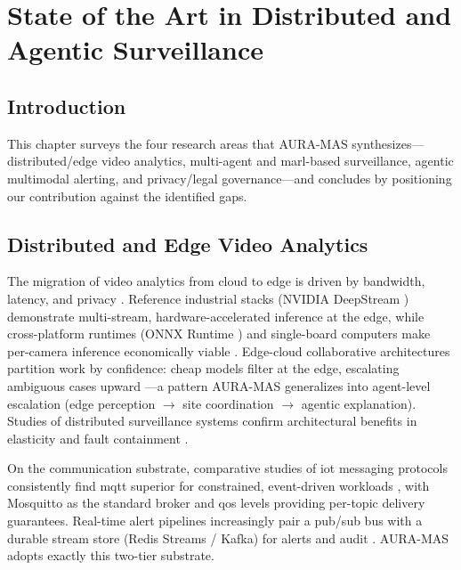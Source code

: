 \chapter{State of the Art in Distributed and Agentic Surveillance}
\label{chap:sota}

\section{Introduction}

This chapter surveys the four research areas that AURA-MAS synthesizes---distributed/edge video analytics, multi-agent and \gls{marl}-based surveillance, agentic multimodal alerting, and privacy/legal governance---and concludes by positioning our contribution against the identified gaps.

\section{Distributed and Edge Video Analytics}

The migration of video analytics from cloud to edge is driven by bandwidth, latency, and privacy \cite{do2025survey, toshpulatov2024edge}. Reference industrial stacks (NVIDIA DeepStream \cite{nvidia2024deepstream}) demonstrate multi-stream, hardware-accelerated inference at the edge, while cross-platform runtimes (ONNX Runtime \cite{kacar2024onnx}) and single-board computers make per-camera inference economically viable \cite{sbc2024review}. Edge-cloud collaborative architectures partition work by confidence: cheap models filter at the edge, escalating ambiguous cases upward \cite{ghasemi2024edgecloudai}---a pattern AURA-MAS generalizes into agent-level escalation (edge perception $\rightarrow$ site coordination $\rightarrow$ agentic explanation). Studies of distributed surveillance systems confirm architectural benefits in elasticity and fault containment \cite{sada2019distributed, karim2024real}.

On the communication substrate, comparative studies of \gls{iot} messaging protocols consistently find \gls{mqtt} superior for constrained, event-driven workloads \cite{zhang2024comparison, almanasrah2026message, arafat2025nextgen}, with Mosquitto as the standard broker \cite{light2017mosquitto} and \gls{qos} levels providing per-topic delivery guarantees. Real-time alert pipelines increasingly pair a pub/sub bus with a durable stream store (Redis Streams / Kafka) for alerts and audit \cite{melancon2026blazeaiot, gulotta2023realtime, yoshino2025high}. AURA-MAS adopts exactly this two-tier substrate.


